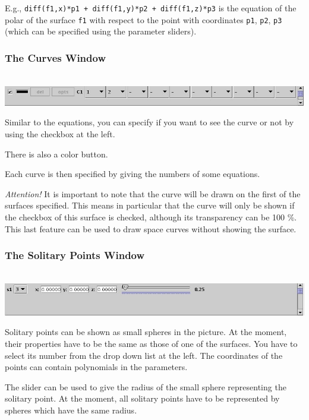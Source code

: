 \documentclass{article}
\newcommand{\attention}{\emph{Attention!}}
\begin{document}
E.g., 
{\tt diff(f1,x)*p1 + diff(f1,y)*p2 + diff(f1,z)*p3}
is the equation of the polar of the surface {\tt f1} with respect to the point
with coordinates {\tt p1}, {\tt p2}, {\tt p3} (which can be specified using
the parameter sliders).


\subsubsection{The Curves Window}

\ \\\includegraphics[scale=0.35]{surfex_curves}

Similar to the equations, you can specify if you want to see the curve or not
by using the checkbox at the left. 

There is also a color button. 

Each curve is then specified by giving the numbers of some equations. 

\attention{}
It is important to note that the curve will be drawn on the first of the
surfaces specified. 
This means in particular that the curve will only be shown if the checkbox of
this surface is checked, although its transparency can be 100 \%.
This last feature can be used to draw space curves without showing the
surface. 


\subsubsection{The Solitary Points Window}

\ \\\includegraphics[scale=0.35]{surfex_points}

Solitary points can be shown as small spheres in the picture. 
At the moment, their properties have to be the same as those of one of the
surfaces. 
You have to select its number from the drop down list at the left. 
The coordinates of the points can contain polynomials in the parameters. 

The slider can be used to give the radius of the small sphere representing the
solitary point. 
At the moment, all solitary points have to be represented by spheres which
have the same radius.
\end{document}
